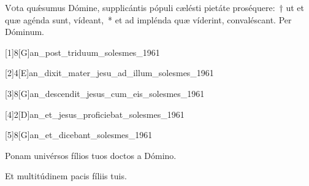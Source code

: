 \documentclass[vesperale_romanum.tex]{subfiles}
\begin{document}
\oratio \label{or_dom_1_pe} 


\lettrine[findent=0.05em]{V}{o}ta quǽsumus Dómine, supplicántis pópuli cælésti pietáte proséquere:~† ut et quæ agénda sunt, vídeant,~* et ad implénda quæ víderint, convaléscant.
Per Dóminum.







[1]{8}[G]{an_post_triduum_solesmes_1961}


[2]{4}[E]{an_dixit_mater_jesu_ad_illum_solesmes_1961}




[3]{8}[G]{an_descendit_jesus_cum_eis_solesmes_1961}


[4]{2}[D]{an_et_jesus_proficiebat_solesmes_1961}


[5]{8}[G]{an_et_dicebant_solesmes_1961}



\vv Ponam univérsos fílios tuos doctos a Dómino.

\rr Et multitúdinem pacis fíliis tuis.

\end{document}
